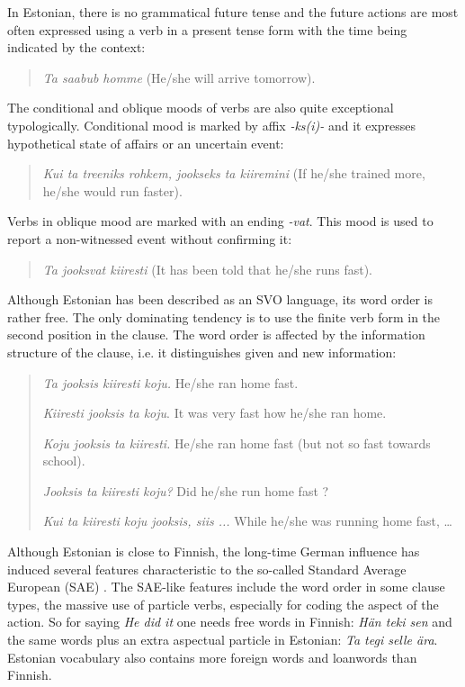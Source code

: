 \begin{multicols}{2}
In Estonian, there is no grammatical future tense and the future actions are most often expressed using a verb in a present tense form with the time being indicated by the context:

\begin{quote}
\textit{Ta saabub homme} (He/she will arrive tomorrow). 
\end{quote}

The conditional and oblique moods of verbs are also quite exceptional typologically. 
Conditional mood is marked by affix \textit{-ks(i)-} and it expresses
hypothetical state of affairs or an uncertain event: 

\begin{quote}
\textit{Kui ta treeniks rohkem, jookseks ta kiire\-mini} (If he/she
trained more, he/she would run faster).
\end{quote}

Verbs in oblique mood are marked with an ending \textit{-vat}. 
This mood is used to report a non-witnessed event without conﬁrming it:

\begin{quote}
\textit{Ta jooksvat kiiresti} (It has been told that he/she runs fast).
\end{quote}

Although Estonian has been described as an SVO language, its word order is rather free. 
The only dominating tendency is to use the ﬁnite verb form in the second position in the clause. 
The word order is affected by the information structure of the clause,
i.e. it distinguishes given and new information:

\begin{quote}

\textit{Ta jooksis kiiresti koju.} 	He/she ran home fast.

\textit{Kiiresti jooksis ta koju}. 	It was very fast how he/she ran
home.

\textit{Koju jooksis ta kiiresti.} 	He/she ran home fast (but not so 
				fast towards school).

\textit{Jooksis ta kiiresti koju?} 	Did he/she run home fast ?

\textit{Kui ta kiiresti koju jooksis, siis ...}	While he/she was running home 
			fast, \ldots

\end{quote}

Although Estonian is close to Finnish, the long-time German influence has induced several features characteristic to the so-called Standard Average European (SAE) \cite{Metslang09}. 
The SAE-like features include the word order in some clause types, the massive use of particle verbs, especially for coding the aspect of the action. 
So for saying \textit{He did it} one needs free words in Finnish: \textit{Hän teki sen} and the same words plus an extra aspectual particle in Estonian: \textit{Ta tegi selle ära}. 
Estonian vocabulary also contains more foreign words and loanwords than Finnish.


\end{multicols}
